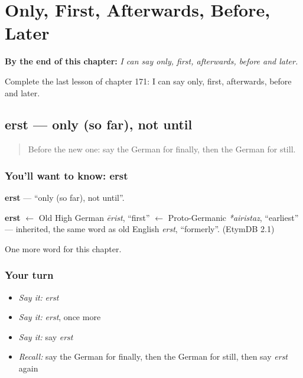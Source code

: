 
\chapter{Only, First, Afterwards, Before, Later}
\label{ch:ge-only-first-afterwards-before-later}

\begin{chapteropening}
\textbf{By the end of this chapter:} \emph{I can say only, first, afterwards, before and later.}

Complete the last lesson of chapter 171: I can say only, first, afterwards, before and later.
\end{chapteropening}

\section[erst]{erst — only (so far), not until}

\label{lesson:GE-C171-erst}



\begin{quote}
Before the new one: say the German for finally, then the German for still.
\end{quote}

\subsection*{You'll want to know: erst}
\textbf{erst} — \textquotedblleft{}only (so far), not until\textquotedblright{}.

\begin{cousinweb}
\textbf{erst} $\leftarrow$ Old High German \emph{ērist}, \textquotedblleft{}first\textquotedblright{} $\leftarrow$ Proto-Germanic \emph{*airistaz}, \textquotedblleft{}earliest\textquotedblright{} — inherited, the same word as old English \emph{erst}, \textquotedblleft{}formerly\textquotedblright{}. (EtymDB 2.1)
\end{cousinweb}

\begin{grammarlens}[title={What you've built}]
One more word for this chapter.
\end{grammarlens}

\subsection*{Your turn}
\begin{itemize}
\raggedright
  \item \emph{Say it:} \emph{erst}
  \item \emph{Say it:} \emph{erst}, once more
  \item \emph{Say it:} say \emph{erst}
  \item \emph{Recall:} say the German for finally, then the German for still, then say \emph{erst} again
\end{itemize}

